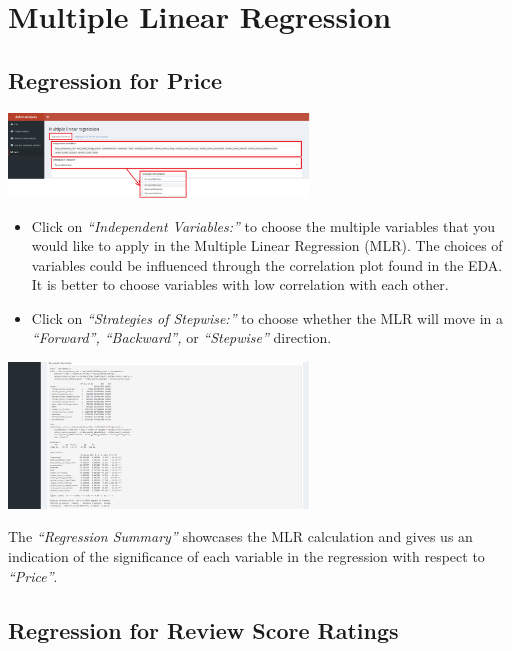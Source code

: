 \documentclass[
]{article}
\providecommand{\tightlist}{%
  \setlength{\itemsep}{0pt}\setlength{\parskip}{0pt}}
\begin{document}
\hypertarget{multiple-linear-regression}{%
\section{Multiple Linear Regression}\label{multiple-linear-regression}}

\hypertarget{regression-for-price}{%
\subsection{Regression for Price}\label{regression-for-price}}

\includegraphics[width=0.6\textwidth,height=\textheight]{images/mlr.png}

\begin{itemize}
\tightlist
\item
  Click on \emph{``Independent Variables:''} to choose the multiple
  variables that you would like to apply in the Multiple Linear
  Regression (MLR). The choices of variables could be influenced through
  the correlation plot found in the EDA. It is better to choose
  variables with low correlation with each other.
\item
  Click on \emph{``Strategies of Stepwise:''} to choose whether the MLR
  will move in a \emph{``Forward'', ``Backward'',} or
  \emph{``Stepwise''} direction.
\end{itemize}

\includegraphics[width=0.6\textwidth,height=\textheight]{images/mlr2.png}

The \emph{``Regression Summary''} showcases the MLR calculation and
gives us an indication of the significance of each variable in the
regression with respect to \emph{``Price''}.

\hypertarget{regression-for-review-score-ratings}{%
\subsection{Regression for Review Score
Ratings}\label{regression-for-review-score-ratings}}
\end{document}

